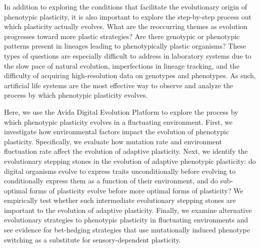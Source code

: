 In addition to exploring the conditions that facilitate the evolutionary origin of phenotypic plasticity, it is also important to explore the step-by-step process out which plasticity actually evolves. 
What are the reoccurring themes as evolution progresses toward more plastic strategies?
Are there genotypic or phenotypic patterns present in lineages leading to phenotypically plastic organisms? 
These types of questions are especially difficult to address in laboratory systems due to the slow pace of natural evolution, imperfections in lineage tracking, and the difficulty of acquiring high-resolution data on genotypes and phenotypes. 
As such, artificial life systems are the most effective way to observe and analyze the process by which phenotypic plasticity evolves.

Here, we use the Avida Digital Evolution Platform \citep{ofria_avida:_2009} to explore the process by which phenotypic plasticity evolves in a fluctuating environment. 
First, we investigate how environmental factors impact the evolution of phenotypic plasticity.
Specifically, we evaluate how mutation rate and environment fluctuation rate affect the evolution of adaptive plasticity.
Next, we identify the evolutionary stepping stones in the evolution of adaptive phenotypic plasticity: do digital organisms evolve to express traits unconditionally before evolving to conditionally express them as a function of their environment, and do sub-optimal forms of plasticity evolve before more optimal forms of plasticity? 
We empirically test whether such intermediate evolutionary stepping stones are important to the evolution of adaptive plasticity. 
Finally, we examine alternative evolutionary strategies to phenotypic plasticity in fluctuating environments and see evidence for bet-hedging strategies that use mutationally induced phenotype switching as a substitute for sensory-dependent plasticity.   